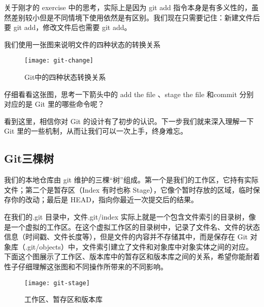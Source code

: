 \begin{note}
关于刚才的 exercise 中的思考，实际上是因为 git add 指令本身是有多义性的，虽然差别较小但是不同情境下使用依然是有区别。我们现在只需要记住：新建文件后要 git add，修改文件后也需要 git add。
\end{note}

我们使用一张图来说明文件的四种状态的转换关系

\begin{figure}[htbp]
	\centering
	\texttt{[image: git-change]}
	\caption{Git中的四种状态转换关系}\label{fig:git-change}
\end{figure}

\begin{thinking}\label{think-箭头与指令}
仔细看看这张图，思考一下箭头中的 add the file 、stage the file 和commit 分别对应的是 Git 里的哪些命令呢？
\end{thinking}

看到这里，相信你对 Git 的设计有了初步的认识。下一步我们就来深入理解一下 Git 里的一些机制，从而让我们可以一次上手，终身难忘。

\subsection{Git三棵树}
我们的本地仓库由 git 维护的三棵“树”组成。第一个是我们的工作区，它持有实际文件；第二个是暂存区（Index 有时也称 Stage），它像个暂时存放的区域，临时保存你的改动；最后是 HEAD，指向你最近一次提交后的结果。

在我们的.git 目录中，文件.git/index 实际上就是一个包含文件索引的目录树，像是一个虚拟的工作区。在这个虚拟工作区的目录树中，记录了文件名、文件的状态信息（时间戳、文件长度等），但是文件的内容并不存储其中，而是保存在 Git 对象库（.git/objects）中，文件索引建立了文件和对象库中对象实体之间的对应。下面这个图展示了工作区、版本库中的暂存区和版本库之间的关系，希望你能耐着性子仔细理解这张图和不同操作所带来的不同影响。

\begin{figure}[htbp]
  \centering
  \texttt{[image: git-stage]}
  \caption{工作区、暂存区和版本库}\label{fig:git-stage}
\end{figure}

